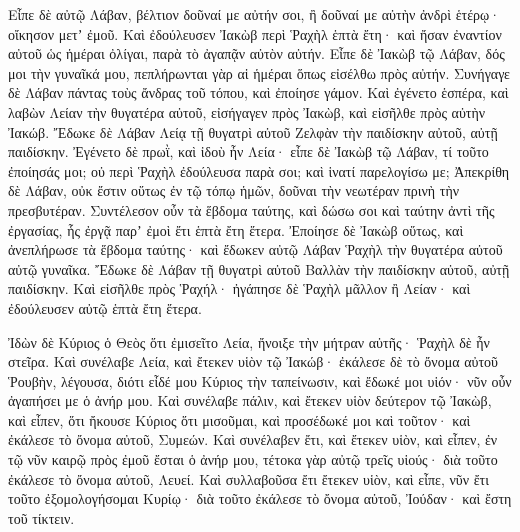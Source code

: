 {Εἶπε δὲ αὐτῷ Λάβαν, βέλτιον δοῦναί με αὐτήν σοι, ἢ δοῦναί με αὐτὴν ἀνδρὶ ἑτέρῳ· οἴκησον μετʼ ἐμοῦ.
Καὶ ἐδούλευσεν Ἰακὼβ περὶ Ῥαχὴλ ἑπτὰ ἔτη· καὶ ἤσαν ἐναντίον αὐτοῦ ὡς ἡμέραι ὀλίγαι, παρὰ τὸ ἀγαπᾷν αὐτὸν αὐτήν.
Εἶπε δὲ Ἰακὼβ τῷ Λάβαν, δός μοι τὴν γυναῖκά μου, πεπλήρωνται γὰρ αἱ ἡμέραι ὅπως εἰσέλθω πρὸς αὐτήν.
Συνήγαγε δὲ Λάβαν πάντας τοὺς ἄνδρας τοῦ τόπου, καὶ ἐποίησε γάμον.
Καὶ ἐγένετο ἑσπέρα, καὶ λαβὼν Λείαν τὴν θυγατέρα αὐτοῦ, εἰσήγαγεν πρὸς Ἰακὼβ, καὶ εἰσῆλθε πρὸς αὐτὴν Ἰακώβ.
Ἔδωκε δὲ Λάβαν Λείᾳ τῇ θυγατρὶ αὐτοῦ Ζελφὰν τὴν παιδίσκην αὐτοῦ, αὐτῇ παιδίσκην.
Ἐγένετο δὲ πρωῒ, καὶ ἰδοὺ ἦν Λεία· εἶπε δὲ Ἰακὼβ τῷ Λάβαν, τί τοῦτο ἐποίησάς μοι; οὐ περὶ Ῥαχὴλ ἐδούλευσα παρὰ σοι; καὶ ἱνατί παρελογίσω με;
Ἀπεκρίθη δὲ Λάβαν, οὐκ ἔστιν οὕτως ἐν τῷ τόπῳ ἡμῶν, δοῦναι τὴν νεωτέραν πρινὴ τὴν πρεσβυτέραν.
Συντέλεσον οὖν τὰ ἕβδομα ταύτης, καὶ δώσω σοι καὶ ταύτην ἀντὶ τῆς ἐργασίας, ἧς ἐργᾷ παρʼ ἐμοὶ ἔτι ἑπτὰ ἔτη ἕτερα.
Ἐποίησε δὲ Ἰακὼβ οὕτως, καὶ ἀνεπλήρωσε τὰ ἕβδομα ταύτης· καὶ ἔδωκεν αὐτῷ Λάβαν Ῥαχὴλ τὴν θυγατέρα αὐτοῦ αὐτῷ γυναῖκα.
Ἔδωκε δὲ Λάβαν τῇ θυγατρὶ αὐτοῦ Βαλλὰν τὴν παιδίσκην αὐτοῦ, αὐτῇ παιδίσκην.
Καὶ εἰσῆλθε πρὸς Ῥαχήλ· ἠγάπησε δὲ Ῥαχὴλ μᾶλλον ἢ Λείαν· καὶ ἐδούλευσεν αὐτῷ ἑπτὰ ἔτη ἕτερα.
\par }{\PP {}Ἰδὼν δὲ Κύριος ὁ Θεὸς ὅτι ἐμισεῖτο Λεία, ἤνοιξε τὴν μήτραν αὐτῆς· Ῥαχὴλ δὲ ἦν στεῖρα.
Καὶ συνέλαβε Λεία, καὶ ἔτεκεν υἱὸν τῷ Ἰακώβ· ἐκάλεσε δὲ τὸ ὄνομα αὐτοῦ Ῥουβὴν, λέγουσα, διότι εἶδέ μου Κύριος τὴν ταπείνωσιν, καὶ ἔδωκέ μοι υἱόν· νῦν οὖν ἀγαπήσει με ὁ ἀνήρ μου.
Καὶ συνέλαβε πάλιν, καὶ ἔτεκεν υἱὸν δεύτερον τῷ Ἰακὼβ, καὶ εἶπεν, ὅτι ἤκουσε Κύριος ὅτι μισοῦμαι, καὶ προσέδωκέ μοι καὶ τοῦτον· καὶ ἐκάλεσε τὸ ὄνομα αὐτοῦ, Συμεών.
Καὶ συνέλαβεν ἔτι, καὶ ἔτεκεν υἱὸν, καὶ εἶπεν, ἐν τῷ νῦν καιρῷ πρὸς ἐμοῦ ἔσται ὁ ἀνήρ μου, τέτοκα γὰρ αὐτῷ τρεῖς υἱούς· διὰ τοῦτο ἐκάλεσε τὸ ὄνομα αὐτοῦ, Λευεί.
Καὶ συλλαβοῦσα ἔτι ἔτεκεν υἱὸν, καὶ εἶπε, νῦν ἔτι τοῦτο ἐξομολογήσομαι Κυρίῳ· διὰ τοῦτο ἐκάλεσε τὸ ὄνομα αὐτοῦ, Ἰούδαν· καὶ ἔστη τοῦ τίκτειν.

}
